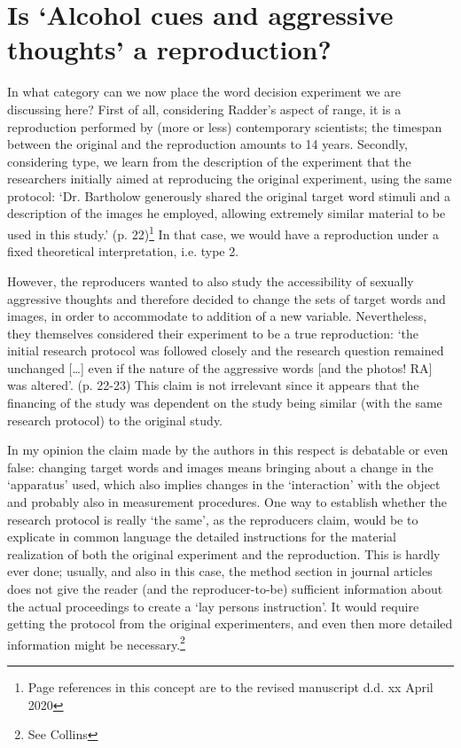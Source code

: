 \documentclass[twocolumn, serif, review, authordate]{jote-article}
\begin{document}
{}
\section*{Is `Alcohol cues and aggressive thoughts' a reproduction?}
\gotoreview
\label{sec:reproduction}
\noindent In what category can we now place the word decision experiment we are discussing here? First of all, considering Radder's aspect of range, it is a reproduction performed by (more or less) contemporary scientists; the timespan between the original and the reproduction amounts to 14 years. Secondly, considering type, we learn from the description of the experiment that the researchers initially aimed at reproducing the original experiment, using the same protocol: `Dr. Bartholow generously shared the original target word stimuli and a description of the images he employed, allowing extremely similar material to be used in this study.' (p. 22)\footnote{ Page references in this concept are to the revised manuscript d.d. xx April 2020} In that case, we would have a reproduction under a fixed theoretical interpretation, i.e. type 2.
 
However, the reproducers wanted to also study the accessibility of sexually aggressive thoughts and therefore decided to change the sets of target words and images, in order to accommodate to addition of a new variable. Nevertheless, they themselves considered their experiment to be a true reproduction: `the initial research protocol was followed closely and the research question remained unchanged [{\dots}] even if the nature of the aggressive words [and the photos! RA] was altered'. (p. 22-23) This claim is not irrelevant since it appears that the financing of the study was dependent on the study being similar (with the same research protocol) to the original study. 
 
In my opinion the claim made by the authors in this respect is debatable or even false: changing target words and images means bringing about a change in the `apparatus' used, which also implies changes in the `interaction' with the object and probably also in measurement procedures. One way to establish whether the research protocol is really `the same', as the reproducers claim, would be to explicate in common language the detailed instructions for the material realization of both the original experiment and the reproduction. This is hardly ever done; usually, and also in this case, the method section in journal articles does not give the reader (and the reproducer-to-be) sufficient information about the actual proceedings to create a `lay persons instruction'. It would require getting the protocol from the original experimenters, and even then more detailed information might be necessary.\footnote{ See Collins}
\end{document}
